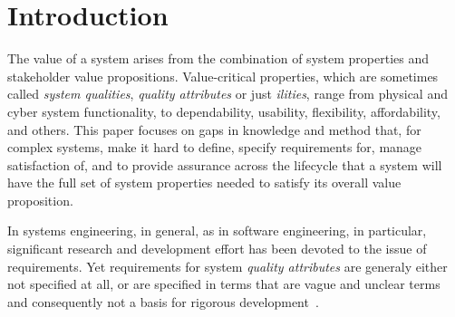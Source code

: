 \documentclass[conference]{IEEEtran}
\begin{document}
\IEEEpeerreviewmaketitle



\section{Introduction}
The value of a system arises from the combination of system properties and stakeholder value propositions. Value-critical properties, which are sometimes called {\em system qualities}, {\em quality attributes} or just {\em ilities}, range from physical and cyber system functionality, to dependability, usability, flexibility, affordability, and others. This paper focuses on gaps in knowledge and method that, for complex systems, make it hard to define, specify requirements for, manage satisfaction of, and to provide assurance across the lifecycle that a system will have the  full set of system properties needed to satisfy its overall value proposition. 

In systems engineering, in general, as in software engineering, in particular, significant research and development effort has been devoted to the issue of requirements. Yet requirements for system {\em quality attributes} are generaly either not specified at all, or are specified in terms that are vague and unclear terms and consequently not a basis for rigorous development~\cite{bosch-isa99}. 
\end{document}
